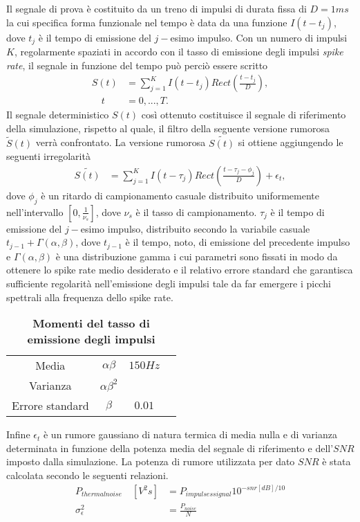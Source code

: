 \documentclass[9pt,twocolumn,twoside]{osajnl}
\begin{document}
Il segnale di prova è costituito da un treno di impulsi di durata fissa di $D=1ms$ la cui specifica forma funzionale nel tempo è data da una funzione $I(t-t_{j})$, dove $t_{j}$ è il tempo di emissione del $j-$esimo impulso. Con un numero di impulsi $K$, regolarmente spaziati in accordo con il tasso di emissione degli impulsi {\it spike rate}, il segnale in funzione del tempo può perciò essere scritto 
%
\begin{align*}
S(t) & = \sum_{j=1}^{K} I(t - t_{j})Rect(\frac{t-t_{j}}{D}),   \\
\quad t & = 0, ..., T.
\end{align*}
%
Il segnale deterministico $S(t)$ così ottenuto costituisce il segnale di riferimento della simulazione, rispetto al quale, il filtro della seguente versione rumorosa $\tilde{S}(t)$ verrà confrontato.
La versione rumorosa $\tilde{S(t)}$ si ottiene aggiungendo le seguenti irregolarità
%
\begin{align*}
\tilde{S(t)} & = \sum_{j=1}^{K} I(t - \tau_{j})Rect(\frac{t-\tau_{j}-\phi_{j}}{D}) 
 + \epsilon_{t},
 \end{align*}
%
dove $\phi_{j}$ è un ritardo di campionamento casuale distribuito uniformemente nell'intervallo $[0,\frac{1}{\nu_{s}}]$, dove $\nu_{s}$ è il tasso di campionamento. $\tau_{j}$ è il tempo di emissione del $j-$esimo impulso, distribuito secondo la variabile casuale $t_{j-1}+\Gamma(\alpha, \beta)$, dove $t_{j-1}$ è il tempo, noto, di emissione del precedente impulso e $\Gamma(\alpha, \beta)$ è una distribuzione gamma i cui parametri sono fissati in modo da ottenere lo spike rate medio desiderato e il relativo errore standard che garantisca sufficiente regolarità nell'emissione degli impulsi tale da far emergere i picchi spettrali alla frequenza dello spike rate.
%
\begin{table}[htbp]
\centering
\caption{\bf Momenti del tasso di emissione degli impulsi}
\begin{tabular}{cccc}
\hline
Media            & $\alpha\beta$      & $150Hz$   \\
Varianza         & $\alpha\beta^{2}$  &           \\
Errore standard  & $\beta$            & $0.01$    \\
\hline
\end{tabular}
\label{tab:momenti}
\end{table}
%
Infine $\epsilon_{t}$ è un rumore gaussiano di natura termica di media nulla e di varianza determinata in funzione della potenza media del segnale di riferimento e dell'$SNR$ imposto dalla simulazione. La potenza di rumore utilizzata per dato $SNR$ è stata calcolata secondo le seguenti relazioni.
\begin{align*}
P_{thermal noise} \quad [V^2s] &=  P_{impulses signal} 10^{- snr [dB]/10} \\
\sigma^{2}_{\epsilon} &= \frac{ P_{noise} }{ N }
\end{align*}
\end{document}
